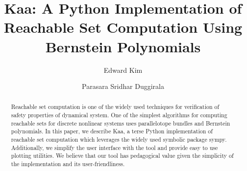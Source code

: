 \documentclass[EPiC]{easychair}
\begin{document}
%
\title{Kaa: A Python Implementation of Reachable Set Computation Using Bernstein Polynomials}
%
%
\author{Edward Kim
\and
Parasara Sridhar Duggirala
}
%
%
%
\maketitle              %
%
\begin{abstract}
Reachable set computation is one of the widely used techniques for verification of safety properties of dynamical system. 
%
One of the simplest algorithms for computing reachable sets for discrete nonlinear systems uses parallelotope bundles and Bernstein polynomials.
%
In this paper, we describe Kaa, a terse Python implementation of reachable set computation which leverages the widely used symbolic package sympy.
%
Additionally, we simplify the user interface with the tool and provide easy to use plotting utilities.
%
%
We believe that our tool has pedagogical value given the simplicity of the implementation and its user-friendliness.
%
\end{abstract}

\end{document}
